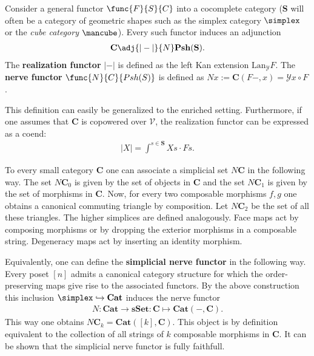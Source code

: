     \begin{construct}\label{model:nerve_and_realization}
        Consider a general functor $\func{F}{S}{C}$ into a cocomplete category ($\mathbf{S}$ will often be a category of geometric shapes such as the simplex category $\simplex$ or the \textit{cube category} $\mbox{\mancube}$). Every such functor induces an adjunction
        \begin{gather}
            \mathbf{C}\adj{|-|}{N}\mathbf{Psh}(\mathbf{S}).
        \end{gather}
        The \textbf{realization functor} $|-|$ is defined as the left Kan extension $\mathrm{Lan}_{\mathcal{Y}}F$. The \textbf{nerve functor} $\func{N}{C}{Psh(S)}$ is defined as $Nx:=\mathbf{C}(F-,x)=\mathcal{Y}x\circ F$.

        This definition can easily be generalized to the enriched setting. Furthermore, if one assumes that $\mathbf{C}$ is copowered over $\mathcal{V}$, the realization functor can be expressed as a coend:
        \begin{gather}
            |X| = \int^{s\in\mathbf{S}}Xs\cdot Fs.
        \end{gather}
    \end{construct}

    \begin{example}\label{model:nerve}
        To every small category \textbf{C} one can associate a simplicial set $N\mathbf{C}$ in the following way. The set $N\mathbf{C}_0$ is given by the set of objects in $\mathbf{C}$ and the set $N\mathbf{C}_1$ is given by the set of morphisms in $\mathbf{C}$. Now, for every two composable morphisms $f,g$ one obtains a canonical commuting triangle by composition. Let $N\mathbf{C}_2$ be the set of all these triangles. The higher simplices are defined analogously. Face maps act by composing morphisms or by dropping the exterior morphisms in a composable string. Degeneracy maps act by inserting an identity morphism.

        Equivalently, one can define the \textbf{simplicial nerve functor} in the following way. Every poset $[n]$ admits a canonical category structure for which the order-preserving maps give rise to the associated functors. By the above construction this inclusion $\simplex\hookrightarrow\mathbf{Cat}$ induces the nerve functor
        \begin{gather}
            N:\mathbf{Cat}\rightarrow\mathbf{sSet}:\mathbf{C}\mapsto\mathbf{Cat}(-,\mathbf{C}).
        \end{gather}
        This way one obtains $N\mathbf{C}_k=\mathbf{Cat}([k], \mathbf{C})$. This object is by definition equivalent to the collection of all strings of $k$ composable morphisms in $\mathbf{C}$. It can be shown that the simplicial nerve functor is fully faithfull.
    \end{example}


